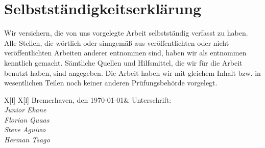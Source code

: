 \section*{Selbstständigkeitserklärung}

Wir versichern, die von uns vorgelegte Arbeit selbstständig verfasst zu haben. Alle Stellen, die wörtlich oder sinngemäß aus veröffentlichten oder nicht veröffentlichten Arbeiten anderer entnommen sind, 
haben wir als entnommen kenntlich gemacht. Sämtliche Quellen und Hilfsmittel, die wir für die Arbeit benutzt haben, sind angegeben. Die Arbeit haben wir mit gleichem Inhalt bzw. in wesentlichen 
Teilen noch keiner anderen Prüfungsbehörde vorgelegt.

\vspace*{1cm}

\begin{tblr}{X[l] X[l]}
Bremerhaven, den \today & Unterschrift:\\
  \textit{Junior Ekane}\\
  \textit{Florian Quaas}\\
  \textit{Steve Aguiwo}\\
  \textit{Herman Tsago}
\end{tblr}
